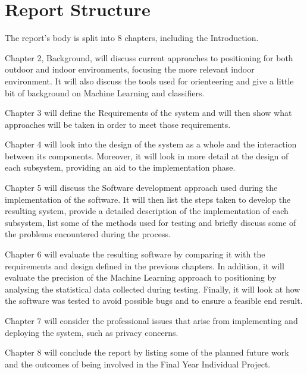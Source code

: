 \documentclass[12pt]{informatics-report}
\begin{document}
\section{Report Structure}
The report’s body is split into 8 chapters, including the Introduction.

Chapter 2, Background, will discuss current approaches to positioning for both outdoor and indoor environments, focusing the more relevant indoor environment. It will also discuss the tools used for orienteering and give a little bit of background on Machine Learning and classifiers.

Chapter 3 will define the Requirements of the system and will then show what approaches will be taken in order to meet those requirements.

Chapter 4 will look into the design of the system as a whole and the interaction between its components. Moreover, it will look in more detail at the design of each subsystem, providing an aid to the implementation phase.

Chapter 5 will discuss the Software development approach used during the implementation of the software. It will then list the steps taken to develop the resulting system, provide a detailed description of the implementation of each subsystem, list some of the methods used for testing and briefly discuss some of the problems encountered during the process.

Chapter 6 will evaluate the resulting software by comparing it with the requirements and design defined in the previous chapters. In addition, it will evaluate the precision of the Machine Learning approach to positioning by analysing the statistical data collected during testing. Finally, it will look at how the software was tested to avoid possible bugs and to ensure a feasible end result.

Chapter 7 will consider the professional issues that arise from implementing and deploying
the system, such as privacy concerns.

Chapter 8 will conclude the report by listing some of the planned future work and the
outcomes of being involved in the Final Year Individual Project.











\end{document}
